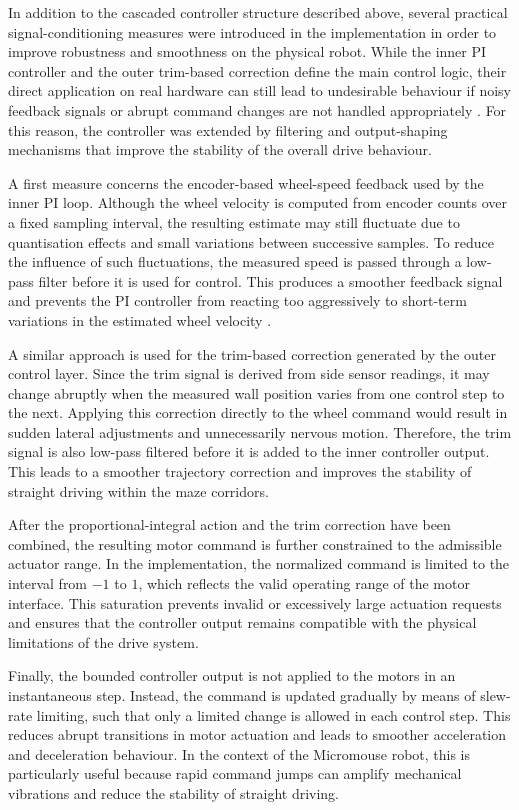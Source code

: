 In addition to the cascaded controller structure described above, several practical signal-conditioning measures were introduced in the implementation in order to improve robustness and smoothness on the physical robot. While the inner PI controller and the outer trim-based correction define the main control logic, their direct application on real hardware can still lead to undesirable behaviour if noisy feedback signals or abrupt command changes are not handled appropriately \cite{vaseghi1996signal}. For this reason, the controller was extended by filtering and output-shaping mechanisms that improve the stability of the overall drive behaviour.

A first measure concerns the encoder-based wheel-speed feedback used by the inner PI loop. Although the wheel velocity is computed from encoder counts over a fixed sampling interval, the resulting estimate may still fluctuate due to quantisation effects and small variations between successive samples. To reduce the influence of such fluctuations, the measured speed is passed through a low-pass filter before it is used for control. This produces a smoother feedback signal and prevents the PI controller from reacting too aggressively to short-term variations in the estimated wheel velocity \cite{schroeder2015antriebe}.

A similar approach is used for the trim-based correction generated by the outer control layer. Since the trim signal is derived from side sensor readings, it may change abruptly when the measured wall position varies from one control step to the next. Applying this correction directly to the wheel command would result in sudden lateral adjustments and unnecessarily nervous motion. Therefore, the trim signal is also low-pass filtered before it is added to the inner controller output. This leads to a smoother trajectory correction and improves the stability of straight driving within the maze corridors.

After the proportional-integral action and the trim correction have been combined, the resulting motor command is further constrained to the admissible actuator range. In the implementation, the normalized command is limited to the interval from $-1$ to $1$, which reflects the valid operating range of the motor interface. This saturation prevents invalid or excessively large actuation requests and ensures that the controller output remains compatible with the physical limitations of the drive system.

Finally, the bounded controller output is not applied to the motors in an instantaneous step. Instead, the command is updated gradually by means of slew-rate limiting, such that only a limited change is allowed in each control step. This reduces abrupt transitions in motor actuation and leads to smoother acceleration and deceleration behaviour. In the context of the Micromouse robot, this is particularly useful because rapid command jumps can amplify mechanical vibrations and reduce the stability of straight driving.

